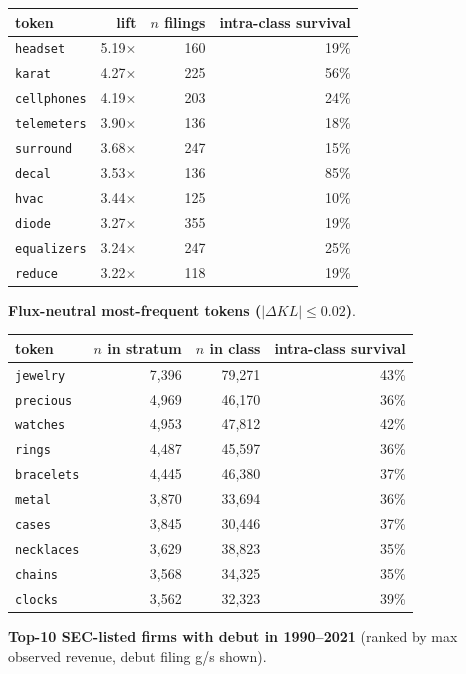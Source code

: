 \begin{tabular}{lrrr}
\toprule
token & lift & $n$ filings & intra-class survival \\
\midrule
\texttt{headset} & 5.19$\times$ & 160 & 19\% \\
\texttt{karat} & 4.27$\times$ & 225 & 56\% \\
\texttt{cellphones} & 4.19$\times$ & 203 & 24\% \\
\texttt{telemeters} & 3.90$\times$ & 136 & 18\% \\
\texttt{surround} & 3.68$\times$ & 247 & 15\% \\
\texttt{decal} & 3.53$\times$ & 136 & 85\% \\
\texttt{hvac} & 3.44$\times$ & 125 & 10\% \\
\texttt{diode} & 3.27$\times$ & 355 & 19\% \\
\texttt{equalizers} & 3.24$\times$ & 247 & 25\% \\
\texttt{reduce} & 3.22$\times$ & 118 & 19\% \\
\bottomrule
\end{tabular}

\textbf{Flux-neutral most-frequent tokens ($|\Delta KL|\leq 0.02$)}.

\begin{tabular}{lrrr}
\toprule
token & $n$ in stratum & $n$ in class & intra-class survival \\
\midrule
\texttt{jewelry} & 7,396 & 79,271 & 43\% \\
\texttt{precious} & 4,969 & 46,170 & 36\% \\
\texttt{watches} & 4,953 & 47,812 & 42\% \\
\texttt{rings} & 4,487 & 45,597 & 36\% \\
\texttt{bracelets} & 4,445 & 46,380 & 37\% \\
\texttt{metal} & 3,870 & 33,694 & 36\% \\
\texttt{cases} & 3,845 & 30,446 & 37\% \\
\texttt{necklaces} & 3,629 & 38,823 & 35\% \\
\texttt{chains} & 3,568 & 34,325 & 35\% \\
\texttt{clocks} & 3,562 & 32,323 & 39\% \\
\bottomrule
\end{tabular}

\textbf{Top-10 SEC-listed firms with debut in 1990--2021} (ranked by max observed revenue, debut filing g/s shown).


